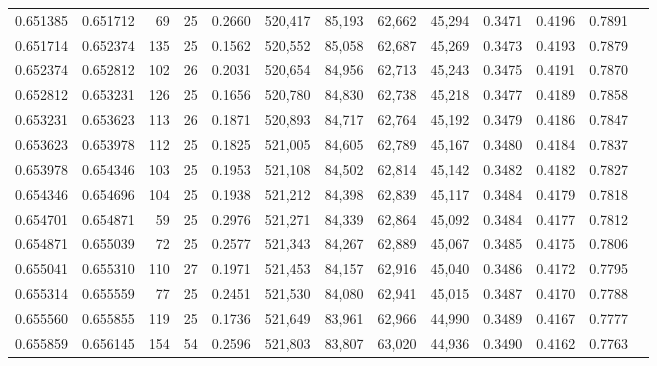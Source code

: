 \begin{tabular}{rrrrrrrrrrrrr}
0.651385 & 0.651712 &    69 &  25 &                                     0.2660 & 520,417 &  85,193 &  62,662 &  45,294 & 0.3471 & 0.4196 & 0.7891 \\
0.651714 & 0.652374 &   135 &  25 &                                     0.1562 & 520,552 &  85,058 &  62,687 &  45,269 & 0.3473 & 0.4193 & 0.7879 \\
0.652374 & 0.652812 &   102 &  26 &                                     0.2031 & 520,654 &  84,956 &  62,713 &  45,243 & 0.3475 & 0.4191 & 0.7870 \\
0.652812 & 0.653231 &   126 &  25 &                                     0.1656 & 520,780 &  84,830 &  62,738 &  45,218 & 0.3477 & 0.4189 & 0.7858 \\
0.653231 & 0.653623 &   113 &  26 &                                     0.1871 & 520,893 &  84,717 &  62,764 &  45,192 & 0.3479 & 0.4186 & 0.7847 \\
0.653623 & 0.653978 &   112 &  25 &                                     0.1825 & 521,005 &  84,605 &  62,789 &  45,167 & 0.3480 & 0.4184 & 0.7837 \\
0.653978 & 0.654346 &   103 &  25 &                                     0.1953 & 521,108 &  84,502 &  62,814 &  45,142 & 0.3482 & 0.4182 & 0.7827 \\
0.654346 & 0.654696 &   104 &  25 &                                     0.1938 & 521,212 &  84,398 &  62,839 &  45,117 & 0.3484 & 0.4179 & 0.7818 \\
0.654701 & 0.654871 &    59 &  25 &                                     0.2976 & 521,271 &  84,339 &  62,864 &  45,092 & 0.3484 & 0.4177 & 0.7812 \\
0.654871 & 0.655039 &    72 &  25 &                                     0.2577 & 521,343 &  84,267 &  62,889 &  45,067 & 0.3485 & 0.4175 & 0.7806 \\
0.655041 & 0.655310 &   110 &  27 &                                     0.1971 & 521,453 &  84,157 &  62,916 &  45,040 & 0.3486 & 0.4172 & 0.7795 \\
0.655314 & 0.655559 &    77 &  25 &                                     0.2451 & 521,530 &  84,080 &  62,941 &  45,015 & 0.3487 & 0.4170 & 0.7788 \\
0.655560 & 0.655855 &   119 &  25 &                                     0.1736 & 521,649 &  83,961 &  62,966 &  44,990 & 0.3489 & 0.4167 & 0.7777 \\
0.655859 & 0.656145 &   154 &  54 &                                     0.2596 & 521,803 &  83,807 &  63,020 &  44,936 & 0.3490 & 0.4162 & 0.7763 \\

\end{tabular}
